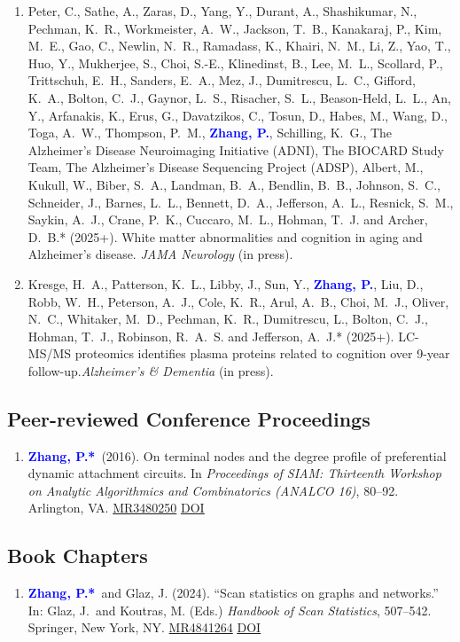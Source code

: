 \documentclass[12pt]{article}
\def \MR #1{\href{http://www.ams.org/mathscinet-getitem?mr=#1}{MR#1}}
\def \DOI #1{\href{http://doi.org/#1}{\underline{DOI}}}
\newcommand{\PZ}{\textcolor{blue}{\textbf{Zhang, P.*}}}
\newcommand{\PZnot}{\textcolor{blue}{\textbf{Zhang, P.}}}
\begin{document}
\begin{enumerate}
		\item {\sc Peter, C., Sathe, A., Zaras, D., Yang, Y.,  
		Durant, A., Shashikumar, N., Pechman, K.\ R., Workmeister, 
		A.\ W., Jackson, T.\ B., Kanakaraj, P., Kim, M.\ E., Gao, 
		C., Newlin, N.\ R., Ramadass, K., Khairi, N.\ M., Li, Z., 
		Yao, T., Huo, Y., Mukherjee, S., Choi, S.-E., Klinedinst, 
		B., Lee, M.\ L., Scollard, P., Trittschuh, E.\ H., Sanders, 
		E.\ A., Mez, J., Dumitrescu, L.\ C., Gifford, K.\ A., 
		Bolton, C.\ J., Gaynor, L.\ S., Risacher, S.\ L., 
		Beason-Held, L.\ L., An, Y., Arfanakis, K., Erus, G., 
		Davatzikos, C., Tosun, D., Habes, M., Wang, D., Toga, A.\ 
		W., Thompson, P.\ M.,} \PZnot, 
		{\sc Schilling, K.\ G., The Alzheimer’s Disease Neuroimaging 
		Initiative (ADNI), The BIOCARD Study Team, The Alzheimer’s 
		Disease Sequencing Project (ADSP), Albert, M., Kukull, W., 
		Biber, S.\ A., Landman, B.\ A., Bendlin, B.\ B., Johnson, 
		S.\ C., Schneider, J., Barnes, L.\ L., Bennett, D.\ A., 
		Jefferson, A.\ L., Resnick, S.\ M., Saykin, A.\ J., Crane, 
		P.\ K., Cuccaro, M.\ L., Hohman, T.\ J.} and {\sc Archer, 
		D.\ B.*} (2025+). White matter abnormalities and cognition 
		in aging and Alzheimer’s disease. {\em JAMA Neurology} (in 
		press).
		
		\item {\sc Kresge, H.\ A., Patterson, K.\ L., Libby, J., 
		Sun, Y.,} \PZnot, {\sc Liu, D., Robb, W.\ H., Peterson, A.\ 
		J., Cole, K.\ R., Arul, A.\ B., Choi, M.\ J., Oliver, N.\ 
		C., Whitaker, M.\ D., Pechman, K.\ R., Dumitrescu, L., 
		Bolton, C.\ J., Hohman, T.\ J., Robinson, R.\ A.\ S.} and 
		{\sc Jefferson, A.\ J.*} (2025+). LC-MS/MS proteomics 
		identifies plasma proteins related to cognition over 9-year 
		follow-up.{\em Alzheimer's \& Dementia} (in press).
\end{enumerate} 
	
	\subsection*{Peer-reviewed Conference Proceedings}
	\begin{enumerate}
		\item \PZ\ (2016). On terminal nodes and the degree 
		profile of preferential dynamic attachment circuits. In 
		\emph{Proceedings of SIAM: Thirteenth Workshop on Analytic 
		Algorithmics and Combinatorics (ANALCO 16)}, 80--92. 
		Arlington, VA. \MR{3480250} \DOI{10.1137/1.9781611974324.9}
	\end{enumerate}
	
	\subsection*{Book Chapters}
	\begin{enumerate}
		\item \PZ\ and {\sc Glaz, J.} (2024). ``Scan 
		statistics on graphs and networks.'' In: Glaz, J.\ and 
		Koutras, M. (Eds.) {\em Handbook of Scan Statistics}, 
		507--542. Springer, New York, NY. 
		\MR{4841264} \DOI{10.1007/978-1-4614-8033-4_43}	
	\end{enumerate}
	
\end{document}
